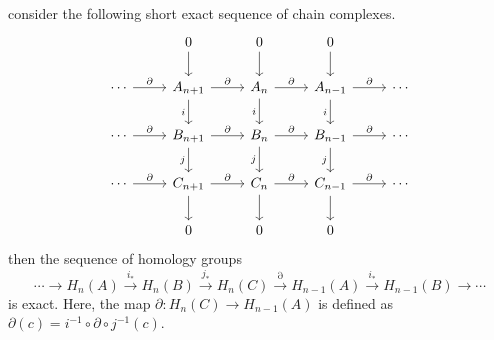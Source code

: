 \begin{thm} consider the following short exact sequence of chain complexes.
\begin{equation}
\begin{tikzcd}
&0\arrow{d}&0\arrow{d}&0\arrow{d}&\\
\cdots\arrow{r}{\partial}&A_{n+1}\arrow{r}{\partial}\arrow[swap]{d}{i}&A_n\arrow{r}{\partial}\arrow[swap]{d}{i}&A_{n-1}\arrow{r}{\partial}\arrow[swap]{d}{i}&\cdots\\
\cdots\arrow{r}{\partial}&B_{n+1}\arrow{r}{\partial}\arrow[swap]{d}{j}&B_{n}\arrow{r}{\partial}\arrow[swap]{d}{j}&B_{n-1}\arrow{r}{\partial}\arrow[swap]{d}{j}&\cdots\\
\cdots\arrow{r}{\partial}&C_{n+1}\arrow{r}{\partial}\arrow[swap]{d}&C_{n}\arrow{r}{\partial}\arrow[swap]{d}&C_{n-1}\arrow{r}{\partial}\arrow[swap]{d}&\cdots\\
&0&0&0&
\end{tikzcd}
\end{equation}
then the sequence of homology groups
\begin{equation}
\cdots\rightarrow H_n(A)\xrightarrow{i_*} H_n(B)\xrightarrow {j_*} H_n(C)\xrightarrow{\partial} H_{n-1}(A)\xrightarrow{i_*}H_{n-1}(B)\rightarrow\cdots
\end{equation}
is exact. Here, the map $\partial : H_n(C)\rightarrow H_{n-1}(A)$ is defined as $\partial(c)=i^{-1}\circ \partial \circ j^{-1}(c)$.
\end{thm}
